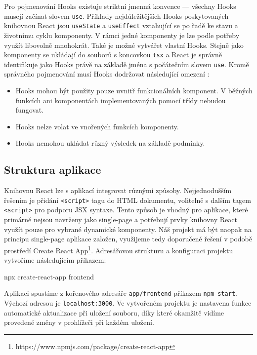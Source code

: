 Pro pojmenování Hooks existuje striktní jmenná konvence --- všechny Hooks musejí začínat slovem \texttt{use}. Příklady nejdůležitějších Hooks poskytovaných knihovnou React jsou \texttt{useState} a \texttt{useEffect} vztahující se po řadě ke stavu a životnímu cyklu komponenty. V rámci jedné komponenty je lze podle potřeby využít libovolně mnohokrát. Také je možné vytvářet vlastní Hooks. Stejně jako komponenty se ukládají do souborů s koncovkou \texttt{tsx} a React je správně identifikuje jako Hooks právě na základě jména s počátečním slovem \texttt{use}. Kromě správného pojmenování musí Hooks dodržovat následující omezení \citep{react-hooks-w3c}:
\begin{itemize}
    \item Hooks mohou být použity pouze uvnitř funkcionálních komponent. V běžných funkcích ani komponentách implementovaných pomocí třídy nebudou fungovat.
    \item Hooks nelze volat ve vnořených funkcích komponenty.
    \item Hooks nemohou ukládat různý výsledek na základě podmínky.
\end{itemize}
 
\subsection{Struktura aplikace}

Knihovnu React lze s aplikací integrovat různými způsoby. Nejjednodušším řešením je přidání \texttt{<script>} tagu do HTML dokumentu, volitelně s dalším tagem \texttt{<script>} pro podporu JSX syntaxe. Tento způsob je vhodný pro aplikace, které primárně nejsou navrženy jako single-page a potřebují prvky knihovny React využít pouze pro vybrané dynamické komponenty. Náš projekt má být naopak na principu single-page aplikace založen, využijeme tedy doporučené řešení v podobě prostředí Create React App\footnote{https://www.npmjs.com/package/create-react-app}. Adresářovou strukturu a konfiguraci projektu vytvoříme následujícím příkazem:
\begin{code}
npx create-react-app frontend
\end{code}

Aplikaci spustíme z kořenového adresáře \texttt{app/frontend} příkazem \texttt{npm\,start}. Výchozí adresou je \texttt{localhost:3000}. Ve vytvořeném projektu je nastavena funkce automatické aktualizace při uložení souboru, díky které okamžitě vidíme provedené změny v prohlížeči při každém uložení.

